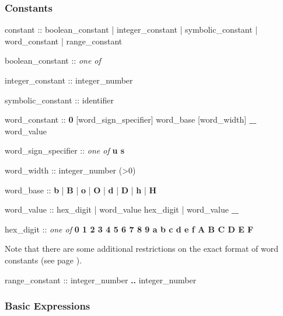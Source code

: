\subsubsection{Constants}
\begin{Grammar}
constant ::
        boolean_constant
      | integer_constant
      | symbolic_constant
      | word_constant
      | range_constant
\end{Grammar}

\begin{Grammar}
boolean_constant :: \emph{one of} 
                     
\end{Grammar}

\begin{Grammar}
integer_constant :: integer_number
\end{Grammar}

\begin{Grammar}
symbolic_constant :: identifier
\end{Grammar}

\begin{Grammar}
word_constant :: \textbf{0} [word_sign_specifier] word_base [word_width] \textbf{_} word_value

word_sign_specifier :: \emph{one of} 
        \textbf{u s}

word_width :: integer_number (>0)

word_base :: \textbf{b} | \textbf{B} | \textbf{o} | \textbf{O} | \textbf{d} | \textbf{D} | \textbf{h} |  \textbf{H}

word_value :: 
        hex_digit
      | word_value hex_digit
      | word_value \textbf{\_}

hex_digit :: \emph{one of}  
        \textbf{0 1 2 3 4 5 6 7 8 9 a b c d e f A B C D E F}
\end{Grammar}

Note that there are some additional restrictions on the exact format of word constants (see page \pageref{the notes on word constants}).

\begin{Grammar}
range_constant :: 
        integer_number \textbf{..} integer_number
\end{Grammar}

\subsubsection{Basic Expressions}

